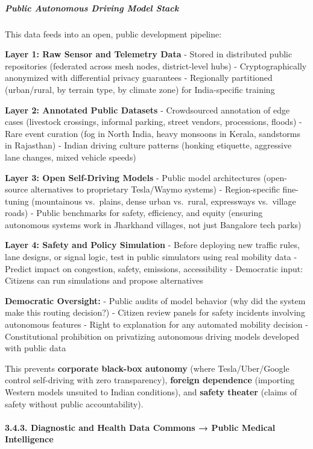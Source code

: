 \subparagraph{Public Autonomous Driving Model
Stack}\label{public-autonomous-driving-model-stack}

This data feeds into an open, public development pipeline:

\textbf{Layer 1: Raw Sensor and Telemetry Data} - Stored in distributed
public repositories (federated across mesh nodes, district-level hubs) -
Cryptographically anonymized with differential privacy guarantees -
Regionally partitioned (urban/rural, by terrain type, by climate zone)
for India-specific training

\textbf{Layer 2: Annotated Public Datasets} - Crowdsourced annotation of
edge cases (livestock crossings, informal parking, street vendors,
processions, floods) - Rare event curation (fog in North India, heavy
monsoons in Kerala, sandstorms in Rajasthan) - Indian driving culture
patterns (honking etiquette, aggressive lane changes, mixed vehicle
speeds)

\textbf{Layer 3: Open Self-Driving Models} - Public model architectures
(open-source alternatives to proprietary Tesla/Waymo systems) -
Region-specific fine-tuning (mountainous vs.~plains, dense urban
vs.~rural, expressways vs.~village roads) - Public benchmarks for
safety, efficiency, and equity (ensuring autonomous systems work in
Jharkhand villages, not just Bangalore tech parks)

\textbf{Layer 4: Safety and Policy Simulation} - Before deploying new
traffic rules, lane designs, or signal logic, test in public simulators
using real mobility data - Predict impact on congestion, safety,
emissions, accessibility - Democratic input: Citizens can run
simulations and propose alternatives

\textbf{Democratic Oversight:} - Public audits of model behavior (why
did the system make this routing decision?) - Citizen review panels for
safety incidents involving autonomous features - Right to explanation
for any automated mobility decision - Constitutional prohibition on
privatizing autonomous driving models developed with public data

This prevents \textbf{corporate black-box autonomy} (where
Tesla/Uber/Google control self-driving with zero transparency),
\textbf{foreign dependence} (importing Western models unsuited to Indian
conditions), and \textbf{safety theater} (claims of safety without
public accountability).

\paragraph{3.4.3. Diagnostic and Health Data Commons → Public Medical
Intelligence}\label{diagnostic-and-health-data-commons-public-medical-intelligence}

